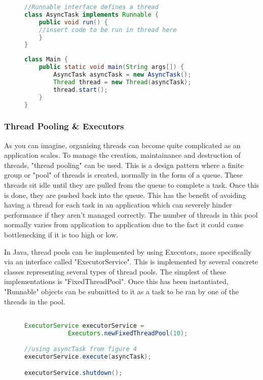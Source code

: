 \documentclass[]{report}
\begin{document}
\begin{figure}[h!]
\caption{}
\begin{lstlisting}[language=Java,frame=single]
//Runnable interface defines a thread
class AsyncTask implements Runnable {
	public void run() {
	//insert code to be run in thread here
	}
}
\end{lstlisting}
\end{figure}

\newpage
\begin{figure}[h!]
\caption{}
\begin{lstlisting}[language=Java,frame=single]
class Main {
	public static void main(String args[]) { 
		AsyncTask asyncTask = new AsyncTask();
		Thread thread = new Thread(asyncTask);
		thread.start();
	}
}
\end{lstlisting}
\end{figure}

\subsubsection{Thread Pooling \& Executors}
As you can imagine, organising threads can become quite complicated as an application scales. To manage the creation, maintainance and destruction of threads, "thread pooling" can be used. This is a design pattern where a finite group or "pool" of threads is created, normally in the form of a queue. These threads sit idle until they are pulled from the queue to complete a task. Once this is done, they are pushed back into the queue. This has the benefit of avoiding having a thread for each task in an application which can severely hinder performance if they aren't managed correctly. The number of threads in this pool normally varies from application to application due to the fact it could cause bottlenecking if it is too high or low.

In Java, thread pools can be implemented by using Executors, more specifically via an interface called "ExecutorService". This is implemented by several concrete classes representing several types of thread pools. The simplest of these implementations is "FixedThreadPool". Once this has been instantiated, "Runnable" objects can be submitted to it as a task to be ran by one of the threads in the pool.\cite{Thread Pools}

\begin{figure}[h!]
\caption{}
\begin{lstlisting}[language=Java,frame=single]

ExecutorService executorService = 
			Executors.newFixedThreadPool(10);

//using asyncTask from figure 4
executorService.execute(asyncTask);

executorService.shutdown();
\end{lstlisting}
\end{figure}
\end{document}
